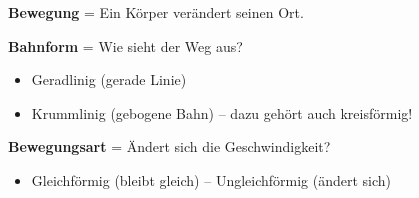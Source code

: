 \documentclass[11pt, a4paper]{article}
\newcommand{\abschnitt}[1]{%
    \vspace{8pt}%
    \noindent{\large\bfseries\textcolor{physik}{#1}}%
    \vspace{4pt}%
}
\begin{document}
\vspace{0.5em}

\abschnitt{6. Zusammenfassung}

\begin{merkkasten}
\textbf{Bewegung} = Ein Körper verändert seinen Ort.

\textbf{Bahnform} = Wie sieht der Weg aus?
\begin{itemize}[leftmargin=1.5em, itemsep=1pt]
    \item Geradlinig (gerade Linie)
    \item Krummlinig (gebogene Bahn) -- dazu gehört auch kreisförmig!
\end{itemize}

\textbf{Bewegungsart} = Ändert sich die Geschwindigkeit?
\begin{itemize}[leftmargin=1.5em, itemsep=1pt]
    \item Gleichförmig (bleibt gleich) -- Ungleichförmig (ändert sich)
\end{itemize}
\end{merkkasten}
\end{document}
